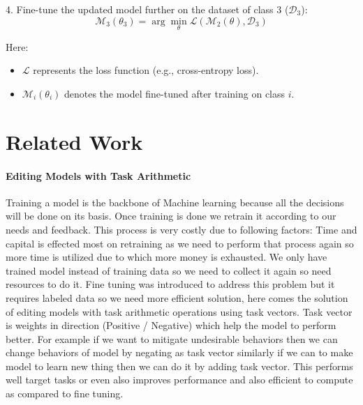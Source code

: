 \documentclass[conference]{IEEEtran}
\begin{document}
4. Fine-tune the updated model further on the dataset of class 3 (\( \mathcal{D}_3 \)):
\begin{equation}
\mathcal{M}_3(\theta_3) = \arg \min_{\theta} \mathcal{L}(\mathcal{M}_2(\theta), \mathcal{D}_3)
\end{equation}

Here:
\begin{itemize}
    \item \( \mathcal{L} \) represents the loss function (e.g., cross-entropy loss).
    \item \( \mathcal{M}_i(\theta_i) \) denotes the model fine-tuned after training on class \( i \).
\end{itemize}



\section{Related Work}
\paragraph{Editing Models with Task Arithmetic} Training a model is the backbone of Machine learning because all the decisions will be done on its basis\cite{paper-1}. Once training is done we retrain it according to our needs and feedback. This process is very costly due to following factors:
Time and capital is effected most on retraining as we need to perform that process again so more time is utilized due to which more money is exhausted. We only have trained model instead of training data so we need to collect it again so need resources to do it.
Fine tuning was introduced to address this problem but it requires labeled data so we need more efficient solution, here comes the solution of editing models with task arithmetic operations using task vectors. Task vector is weights in direction (Positive / Negative) which help the model to perform better.
For example if we want to mitigate undesirable behaviors then we can change behaviors of model by negating as task vector similarly if we can to make model to learn new thing then we can do it by adding task vector. This performs well target tasks or even also improves performance and also efficient to compute as compared to fine tuning.
\end{document}
